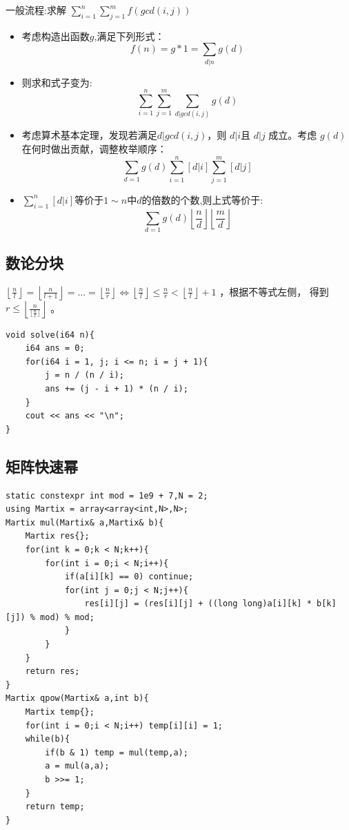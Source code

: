 一般流程:求解 $\displaystyle \sum^{n}_{i = 1}\sum^{m}_{j = 1}f(gcd(i,j))$
\begin{itemize}
    \item 考虑构造出函数$g$,满足下列形式：
            $$f(n) = g \ast 1 = \displaystyle\sum_{d|n} g(d)$$
    \item 则求和式子变为:
        $$\displaystyle \sum^{n}_{i = 1}\sum^{m}_{j = 1}\sum_{d|gcd(i,j)} g(d)$$
    \item 考虑算术基本定理，发现若满足$d|gcd(i,j)$，则 $d|i $且 $d|j$ 成立。考虑 $g(d)$在何时做出贡献，调整枚举顺序：
    $$\displaystyle \sum_{d = 1}g(d) \sum^{n}_{i = 1} [d | i] \sum^{m}_{j = 1} [d | j]$$

    \item $\sum^{n}_{i = 1} [d | i]$等价于$1\sim n$中$d$的倍数的个数,则上式等价于:
     $$\displaystyle \sum_{d = 1}g(d) \left \lfloor \frac{n}{d} \right \rfloor \left \lfloor \frac{m}{d} \right \rfloor$$

\end{itemize}
    
\subsection{数论分块}
$\displaystyle \left\lfloor \frac{n}{l} \right\rfloor = \left\lfloor \frac{n}{l + 1} \right\rfloor
 = ... = \left\lfloor \frac{n}{r} \right\rfloor \iff \left\lfloor \frac{n}{l} \right\rfloor \le \frac{n}{r} 
 < \left\lfloor \frac{n}{l} \right\rfloor + 1$ ，根据不等式左侧，
 得到 $\displaystyle r \le \left\lfloor \frac{n}{\lfloor \frac{n}{l} \rfloor} \right\rfloor$ 。
\begin{lstlisting}[caption={}]
void solve(i64 n){
    i64 ans = 0;
    for(i64 i = 1, j; i <= n; i = j + 1){
        j = n / (n / i);
        ans += (j - i + 1) * (n / i);
    }
    cout << ans << "\n";
}
\end{lstlisting}

\subsection{矩阵快速幂}
\begin{lstlisting}[caption={}]
static constexpr int mod = 1e9 + 7,N = 2;
using Martix = array<array<int,N>,N>;
Martix mul(Martix& a,Martix& b){
    Martix res{};
    for(int k = 0;k < N;k++){
        for(int i = 0;i < N;i++){
            if(a[i][k] == 0) continue;
            for(int j = 0;j < N;j++){
                res[i][j] = (res[i][j] + ((long long)a[i][k] * b[k][j]) % mod) % mod;
            }
        }
    }
    return res;
}
Martix qpow(Martix& a,int b){
    Martix temp{};
    for(int i = 0;i < N;i++) temp[i][i] = 1;
    while(b){
        if(b & 1) temp = mul(temp,a);
        a = mul(a,a);
        b >>= 1;
    }
    return temp;
}
\end{lstlisting}

